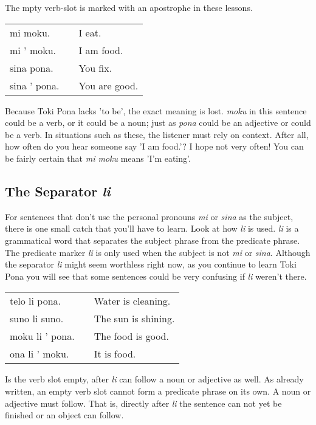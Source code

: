 The mpty verb-slot is marked with an apostrophe in these lessons. 

\begin{supertabular}{p{5cm}|ll}
mi moku. && I eat.  \\
mi ' moku. && I am food. \\  
sina pona. && You fix. \\
sina ' pona. && You are good. \\  
\end{supertabular} 

Because Toki Pona lacks 'to be', the exact meaning is lost. 
\textit{moku} in this sentence could be a verb, or it could be a noun; just as \textit{pona} could be an adjective or could be a verb. 
In situations such as these, the listener must rely on context. 
After all, how often do you hear someone say 'I am food.'? 
I hope not very often! You can be fairly certain that \textit{mi moku} means 'I'm eating'. 
%
\subsection*{The Separator \textit{li} }
%
%
For sentences that don't use the personal pronouns \textit{mi} or \textit{sina} as the subject, there is one small catch that you'll have to learn. 
Look at how \textit{li} is used. 
\textit{li} is a grammatical word that separates the subject phrase from the predicate phrase. 
The predicate marker \textit{li} is only used when the subject is not \textit{mi} or \textit{sina}. 
Although the separator \textit{li} might seem worthless right now, as you continue to learn Toki Pona you will see that some sentences could be very confusing if \textit{li} weren't there. 

\begin{supertabular}{p{5cm}|ll}
telo li pona. && Water is cleaning. \\
suno li suno. && The sun is shining. \\
moku li ' pona. && The food is good. \\ 
ona li ' moku. && It is food. \\
\end{supertabular} 

Is the verb slot empty, after \textit{li} can follow a noun or adjective as well. 
As already written, an empty verb slot cannot form a predicate phrase on its own. 
A noun or adjective must follow. 
That is, directly after \textit{li} the sentence can not yet be finished or an object can follow.
%
\newpage
